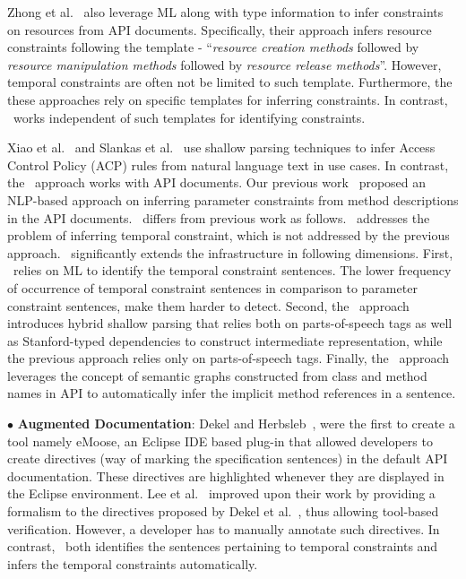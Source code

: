 Zhong et al.~\cite{zhong09SE} also leverage ML along with type information to infer constraints on resources from API documents.
Specifically, their approach infers resource constraints following the template - ``\textit{resource creation methods} followed by \textit{resource manipulation methods} followed by \textit{resource release methods}''.
However, temporal constraints are often not be limited to such template. 
Furthermore, the these approaches rely on specific templates for inferring constraints. In contrast, \tool\ works independent of such templates for identifying constraints.


Xiao et al.~\cite{XiaoFSE2012} and Slankas et al.~\cite{johnSlankasPASSAT13} use shallow parsing techniques to infer Access Control Policy (ACP) rules from natural language text in use cases. In contrast, the \tool\ approach works with API documents.
Our previous work~\cite{pandita12:inferring} proposed an NLP-based approach on inferring parameter constraints from method descriptions in the API documents. \tool\ differs from previous work as follows.
\tool\ addresses the problem of inferring temporal constraint, which is not addressed by the previous approach. \tool\ significantly extends the infrastructure in following dimensions.
First, \tool\ relies on ML to identify the temporal constraint sentences. The lower frequency of occurrence of temporal constraint sentences in comparison to parameter constraint sentences, make them harder to detect.
Second, the \tool\ approach introduces hybrid shallow parsing that relies both on parts-of-speech tags as well as Stanford-typed dependencies to construct intermediate representation, while the previous approach relies only on parts-of-speech tags.
Finally, the \tool\ approach leverages the concept of semantic graphs constructed from class and method names in API to automatically infer the implicit method references in a sentence. 


{\small $\bullet$} \textbf{Augmented Documentation}:
Dekel and Herbsleb~\cite{Dekel2009}, were the first to create a tool namely eMoose,
an Eclipse IDE based plug-in that allowed developers to create directives
(way of marking the specification sentences) in the default API documentation.
These directives are highlighted whenever they are displayed in the Eclipse environment.
Lee et al.~\cite{lee2012towards} improved upon their work by providing a formalism to the directives proposed by Dekel et al.~\cite{Dekel2009},
thus allowing tool-based verification.
However, a developer has to manually annotate such directives.
In contrast, \tool\ both identifies the sentences pertaining to temporal constraints and infers the temporal constraints automatically.